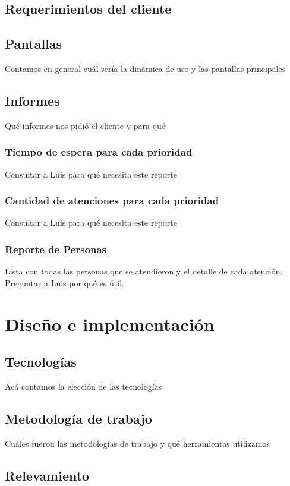 \documentclass[a4paper,10pt]{article}
\begin{document}
\subsection{Requerimientos del cliente}
\subsection{Pantallas}
Contamos en general cuál sería la dinámica de uso y las pantallas principales
\subsection{Informes}
Qué informes nos pidió el cliente y para qué

\subsubsection{Tiempo de espera para cada prioridad}
Consultar a Luis para qué necesita este reporte
\subsubsection{Cantidad de atenciones para cada prioridad}
Consultar a Luis para qué necesita este reporte
\subsubsection{Reporte de Personas}
Lista con todas las personas que se atendieron y el detalle de cada atención. Preguntar a Luis por qué es útil.


\newpage 
\section{Diseño e implementación}
\subsection{Tecnologías}
Acá contamos la elección de las tecnologías

\subsection{Metodología de trabajo}
Cuáles fueron las metodologías de trabajo y qué herramientas utilizamos

\subsection{Relevamiento}
\end{document}
